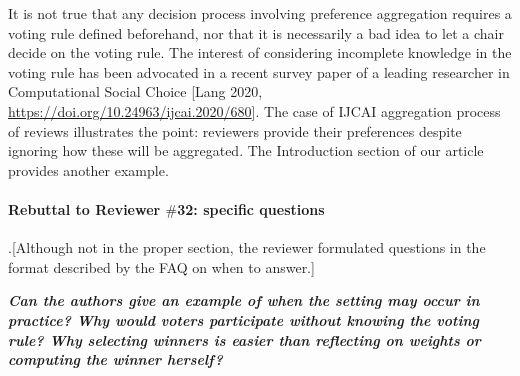 \documentclass{article}
\begin{document}
It is not true that any decision process involving preference aggregation requires a voting rule defined beforehand, nor that it is necessarily a bad idea to let a chair decide on the voting rule. The interest of considering incomplete knowledge in the voting rule has been advocated in a recent survey paper of a leading researcher in Computational Social Choice [Lang 2020, \url{https://doi.org/10.24963/ijcai.2020/680}]. The case of IJCAI aggregation process of reviews illustrates the point: reviewers provide their preferences despite ignoring how these will be aggregated. The Introduction section of our article provides another example.

\paragraph{Rebuttal to Reviewer $\#$32: specific questions}
.[Although not in the proper section, the reviewer formulated questions in the format described by the FAQ on when to answer.]

\textit{\textbf{Can the authors give an example of when the setting may occur in practice? Why would voters participate without knowing the voting rule? Why selecting winners is easier than reflecting on weights or computing the winner herself?}}
\end{document}
